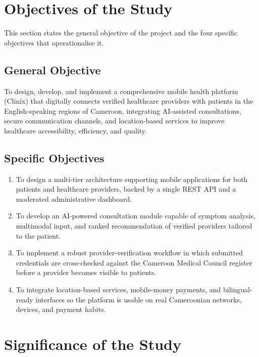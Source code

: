 \section{Objectives of the Study}

This section states the general objective of the project and the four specific objectives that operationalise it.

\subsection{General Objective}

To design, develop, and implement a comprehensive mobile health platform (Clinix) that digitally connects verified healthcare providers with patients in the English-speaking regions of Cameroon, integrating AI-assisted consultations, secure communication channels, and location-based services to improve healthcare accessibility, efficiency, and quality.

\subsection{Specific Objectives}

\begin{enumerate}
  \item To design a multi-tier architecture supporting mobile applications for both patients and healthcare providers, backed by a single REST API and a moderated administrative dashboard.
  \item To develop an AI-powered consultation module capable of symptom analysis, multimodal input, and ranked recommendation of verified providers tailored to the patient.
  \item To implement a robust provider-verification workflow in which submitted credentials are cross-checked against the Cameroon Medical Council register before a provider becomes visible to patients.
  \item To integrate location-based services, mobile-money payments, and bilingual-ready interfaces so the platform is usable on real Cameroonian networks, devices, and payment habits.
\end{enumerate}

\section{Significance of the Study}

